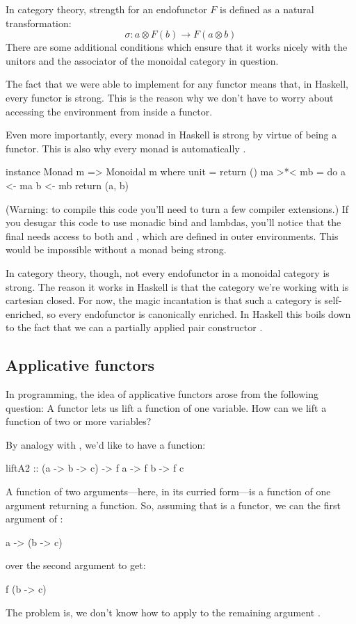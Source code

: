 \documentclass[DaoFP]{subfiles}
\begin{document}
In category theory, strength for an endofunctor $F$ is defined as a natural transformation:
\[ \sigma \colon a \otimes F(b) \to F (a \otimes b) \]
There are some additional conditions which ensure that it works nicely with the unitors and the associator of the monoidal category in question.

The fact that we were able to implement  for any functor means that, in Haskell, every functor is strong. This is the reason why we don't have to worry about accessing the environment from inside a functor. 

Even more importantly, every monad in Haskell is strong by virtue of being a functor. This is also why every monad is automatically . 
\begin{haskell}
instance Monad m => Monoidal m where
  unit = return ()
  ma >*< mb = do
    a <- ma
    b <- mb
    return (a, b)
\end{haskell}
(Warning: to compile this code you'll need to turn a few compiler extensions.) If you desugar this code to use monadic bind and lambdas, you'll notice that the final  needs access to both  and , which are defined in outer environments. This would be impossible without a monad being strong.

In category theory, though, not every endofunctor in a monoidal category is strong. The reason it works in Haskell is that the category we're working with is cartesian closed. For now, the magic incantation is that such a category is self-enriched, so every endofunctor is canonically enriched. In Haskell this boils down to the fact that we can  a partially applied pair constructor .

\subsection{Applicative functors}

In programming, the idea of applicative functors arose from the following question: A functor lets us lift a function of one variable. How can we lift a function of two or more variables? 

By analogy with , we'd like to have a function:
\begin{haskell}
liftA2 :: (a -> b -> c) -> f a -> f b -> f c
\end{haskell}

A function of two arguments---here, in its curried form---is a function of one argument returning a function. So, assuming that  is a functor, we can  the first argument of :
\begin{haskell}
a -> (b -> c)
\end{haskell}
over the second argument  to get:
\begin{haskell}
f (b -> c)
\end{haskell}
The problem is, we don't know how to apply  to the remaining argument . 
\end{document}
